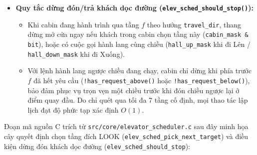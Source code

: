 \begin{itemize}[nosep]
\begin{itemize}[nosep]
    \end{itemize}
    \item \textbf{Quy tắc dừng đón/trả khách dọc đường (\texttt{elev\_sched\_should\_stop()}):}
    \begin{itemize}[nosep]
        \item Khi cabin đang hành trình qua tầng $f$ theo hướng \texttt{travel\_dir}, thang dừng mở cửa ngay nếu khách trong cabin chọn tầng này (\texttt{cabin\_mask \& bit}), hoặc có cuộc gọi hành lang cùng chiều (\texttt{hall\_up\_mask} khi đi Lên / \texttt{hall\_down\_mask} khi đi Xuống).
        \item Với lệnh hành lang ngược chiều đang chạy, cabin chỉ dừng khi phía trước $f$ đã hết yêu cầu (\texttt{!has\_request\_above()} hoặc \texttt{!has\_request\_below()}), bảo đảm phục vụ trọn vẹn một chiều trước khi đón chiều ngược lại ở điểm quay đầu. Do chỉ quét qua tối đa 7 tầng cố định, mọi thao tác lập lịch đạt độ phức tạp xác định $O(1)$.
    \end{itemize}
\end{itemize}


Đoạn mã nguồn C trích từ \texttt{src/core/elevator\_scheduler.c} sau đây minh họa cây quyết định chọn tầng đích LOOK (\texttt{elev\_sched\_pick\_next\_target}) và điều kiện dừng đón khách dọc đường (\texttt{elev\_sched\_should\_stop}):

